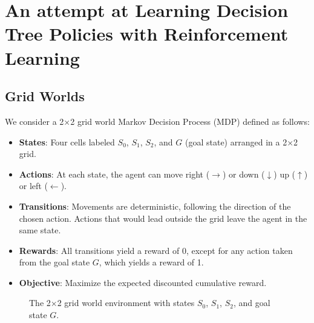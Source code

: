 \chapter{An attempt at Learning Decision Tree Policies with Reinforcement Learning}
\section{Grid Worlds}

We consider a 2×2 grid world Markov Decision Process (MDP) defined as follows:
\begin{itemize}
    \item \textbf{States}: Four cells labeled $S_0$, $S_1$, $S_2$, and $G$ (goal state) arranged in a 2×2 grid.
    \item \textbf{Actions}: At each state, the agent can move right ($\rightarrow$) or down ($\downarrow$) up ($\uparrow$) or left ($\leftarrow$).
    \item \textbf{Transitions}: Movements are deterministic, following the direction of the chosen action. Actions that would lead outside the grid leave the agent in the same state.
    \item \textbf{Rewards}: All transitions yield a reward of 0, except for any action taken from the goal state $G$, which yields a reward of 1.
    \item \textbf{Objective}: Maximize the expected discounted cumulative reward.
\end{itemize}

\begin{figure}[ht]
\centering
{}
\caption{The 2×2 grid world environment with states $S_0$, $S_1$, $S_2$, and goal state $G$.}\label{fig:grid-world}
\end{figure}


